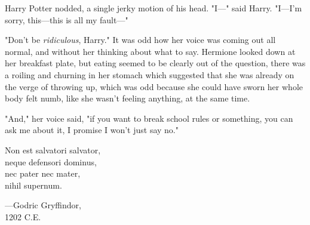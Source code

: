 Harry Potter nodded, a single jerky motion of his head. "I---" said Harry. 
"I---I'm sorry, this---this is all my fault---"

"Don't be \emph{ridiculous}, Harry." It was odd how her voice was coming out 
all normal, and without her thinking about what to say. Hermione looked down at 
her breakfast plate, but eating seemed to be clearly out of the question, there 
was a roiling and churning in her stomach which suggested that she was already 
on the verge of throwing up, which was odd because she could have sworn her 
whole body felt numb, like she wasn't feeling anything, at the same time.

"And," her voice said, "if you want to break school rules or something, you can 
ask me about it, I promise I won't just say no."
\sbreak
\begin{center}
Non est salvatori salvator,\\
neque defensori dominus,\\
nec pater nec mater,\\
nihil supernum.

---Godric Gryffindor,\\
1202 C.E.
\end{center}
